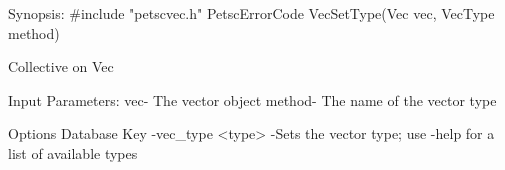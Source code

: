 Synopsis:
#include "petscvec.h"
PetscErrorCode VecSetType(Vec vec, VecType method)

Collective on Vec

Input Parameters:
vec- The vector object
method- The name of the vector type

Options Database Key
-vec_type <type> -Sets the vector type; use -help for a list of available types
